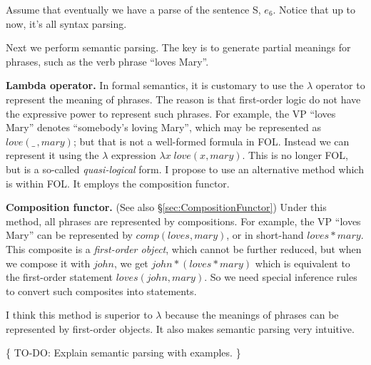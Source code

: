\documentclass[a4paper]{report}
\begin{document}
Assume that eventually we have a parse of the sentence S, $e_6$. Notice that up to now, it's all syntax parsing.

Next we perform semantic parsing.  The key is to generate partial meanings for phrases, such as the verb phrase ``loves Mary''.

\textbf{Lambda operator.}  In formal semantics, it is customary to use the $\lambda$ operator to represent the meaning of phrases.  The reason is that first-order logic do not have the expressive power to represent such phrases.  For example, the VP ``loves Mary'' denotes ``somebody's loving Mary'', which may be represented as $love(\_ \,,mary)$; but that is not a well-formed formula in FOL.  Instead we can represent it using the $\lambda$ expression $\lambda x \; love(x,mary)$.  This is no longer FOL, but is a so-called \textit{quasi-logical} form.  I propose to use an alternative method which is within FOL.  It employs the composition functor.

\textbf{Composition functor.}  (See also \S\ref{sec:CompositionFunctor})  Under this method, all phrases are represented by compositions.  For example, the VP ``loves Mary'' can be represented by $comp(loves,mary)$, or in short-hand $loves * mary$.  This composite is a \textit{first-order object}, which cannot be further reduced, but when we compose it with $john$, we get $john * (loves * mary)$ which is equivalent to the first-order statement $loves(john,mary)$.  So we need special inference rules to convert such composites into statements.

I think this method is superior to $\lambda$ because the meanings of phrases can be represented by first-order objects.  It also makes semantic parsing very intuitive.

\{ TO-DO:  Explain semantic parsing with examples. \}
\end{document}
